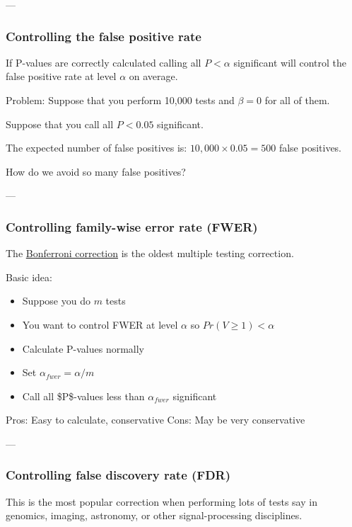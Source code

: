 \documentclass[10pt,article]{article}
\begin{document}
---

\subsubsection{Controlling the false positive rate}
\label{sec:orgb4968de}

If P-values are correctly calculated calling all \(P < \alpha\) significant will control the false positive rate at level \(\alpha\) on average.

Problem: Suppose that you perform 10,000 tests and \(\beta = 0\) for all of them.

Suppose that you call all \(P < 0.05\) significant.

The expected number of false positives is: \(10,000 \times 0.05 = 500\)  false positives.

How do we avoid so many false positives?


---

\subsubsection{Controlling family-wise error rate (FWER)}
\label{sec:org7c654c7}


The \href{http://en.wikipedia.org/wiki/Bonferroni\_correction}{Bonferroni correction} is the oldest multiple testing correction.

Basic idea:
\begin{itemize}
\item Suppose you do \(m\) tests
\item You want to control FWER at level \(\alpha\) so \(Pr(V \geq 1) < \alpha\)
\item Calculate P-values normally
\item Set \(\alpha_{fwer} = \alpha/m\)
\item Call all \$P\$-values less than \(\alpha_{fwer}\) significant
\end{itemize}

Pros: Easy to calculate, conservative
Cons: May be very conservative


---

\subsubsection{Controlling false discovery rate (FDR)}
\label{sec:org4470760}

This is the most popular correction when performing lots of tests say in genomics, imaging, astronomy, or other signal-processing disciplines.
\end{document}
